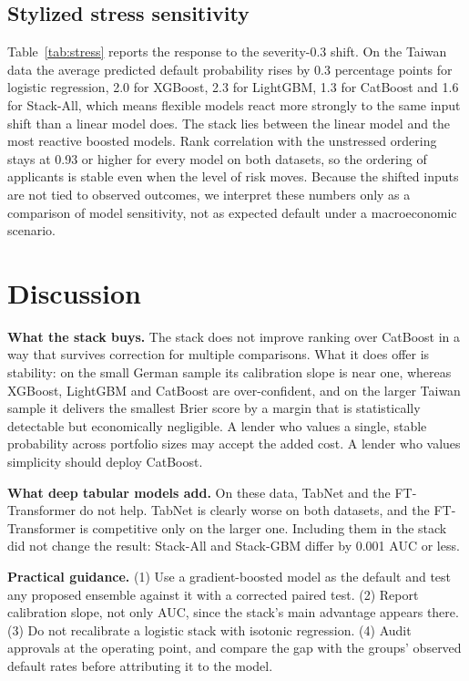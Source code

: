 \documentclass[conference,a4paper]{IEEEtran}
\begin{document}


\subsection{Stylized stress sensitivity}
Table~\ref{tab:stress} reports the response to the severity-0.3 shift. On the Taiwan data the average predicted default probability rises by 0.3 percentage points for logistic regression, 2.0 for XGBoost, 2.3 for LightGBM, 1.3 for CatBoost and 1.6 for Stack-All, which means flexible models react more strongly to the same input shift than a linear model does. The stack lies between the linear model and the most reactive boosted models. Rank correlation with the unstressed ordering stays at 0.93 or higher for every model on both datasets, so the ordering of applicants is stable even when the level of risk moves. Because the shifted inputs are not tied to observed outcomes, we interpret these numbers only as a comparison of model sensitivity, not as expected default under a macroeconomic scenario.



\section{Discussion}
\textbf{What the stack buys.} The stack does not improve ranking over CatBoost in a way that survives correction for multiple comparisons. What it does offer is stability: on the small German sample its calibration slope is near one, whereas XGBoost, LightGBM and CatBoost are over-confident, and on the larger Taiwan sample it delivers the smallest Brier score by a margin that is statistically detectable but economically negligible. A lender who values a single, stable probability across portfolio sizes may accept the added cost. A lender who values simplicity should deploy CatBoost.

\textbf{What deep tabular models add.} On these data, TabNet and the FT-Transformer do not help. TabNet is clearly worse on both datasets, and the FT-Transformer is competitive only on the larger one. Including them in the stack did not change the result: Stack-All and Stack-GBM differ by 0.001 AUC or less.

\textbf{Practical guidance.} (1) Use a gradient-boosted model as the default and test any proposed ensemble against it with a corrected paired test. (2) Report calibration slope, not only AUC, since the stack's main advantage appears there. (3) Do not recalibrate a logistic stack with isotonic regression. (4) Audit approvals at the operating point, and compare the gap with the groups' observed default rates before attributing it to the model.
\end{document}
